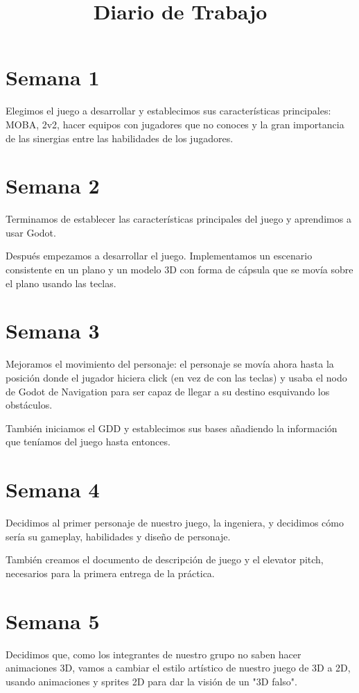\documentclass{article}
\title{Diario de Trabajo}
\date{}
\begin{document}
	\maketitle
	
\section*{Semana 1}
Elegimos el juego a desarrollar y establecimos sus características principales: MOBA, 2v2, hacer equipos con jugadores que no conoces y la gran importancia de las sinergias entre las habilidades de los jugadores.

\section*{Semana 2}
Terminamos de establecer las características principales del juego y aprendimos a usar Godot.

Después empezamos a desarrollar el juego. Implementamos un escenario consistente en un plano y un modelo 3D con forma de cápsula que se movía sobre el plano usando las teclas.

\section*{Semana 3}
Mejoramos el movimiento del personaje: el personaje se movía ahora hasta la posición donde el jugador hiciera click (en vez de con las teclas) y usaba el nodo de Godot de Navigation para ser capaz de llegar a su destino esquivando los obstáculos.

También iniciamos el GDD y establecimos sus bases añadiendo la información que teníamos del juego hasta entonces.

\section*{Semana 4}
Decidimos al primer personaje de nuestro juego, la ingeniera, y decidimos cómo sería su gameplay, habilidades y diseño de personaje.

También creamos el documento de descripción de juego y el elevator pitch, necesarios para la primera entrega de la práctica.

\section*{Semana 5}
Decidimos que, como los integrantes de nuestro grupo no saben hacer animaciones 3D, vamos a cambiar el estilo artístico de nuestro juego de 3D a 2D, usando animaciones y sprites 2D para dar la visión de un "3D falso".
\end{document}
